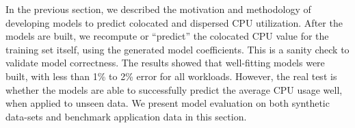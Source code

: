 


In the previous section, we described the motivation and methodology
of developing models to predict colocated and 
dispersed CPU utilization.
After the models are built, we recompute or ``predict'' the colocated
CPU value for the training set itself, using the generated model 
coefficients. This is a sanity check to validate model correctness.
The results showed that well-fitting models 
were built, with less than 1\% to 2\% error for all workloads. However, the real test
is whether the models are able to successfully
predict the average CPU usage well, when applied to unseen data.
We present model evaluation on both synthetic data-sets and benchmark
application data in this section.


% 
% 
% 





